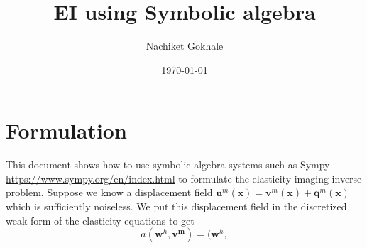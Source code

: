 \documentclass{article}
\newcommand{\beq}{\begin{equation}}
\newcommand{\eeq}{\end{equation}}
\begin{document}
\title{EI using Symbolic algebra}
\author{Nachiket Gokhale}
\date{\today}
\maketitle
\section{Formulation}
This document shows how to use symbolic algebra systems such as Sympy \url{https://www.sympy.org/en/index.html} to formulate the elasticity imaging inverse problem. Suppose we know a displacement field $\pmb{u}^m(\pmb{x})=\pmb{v}^m(\pmb{x}) + \pmb{q}^m(\pmb{x})$ which is sufficiently noiseless. We put this displacement field in the discretized weak form of the elasticity equations to get 
\beq
a(\pmb{w}^h,\pmb{v^m}) = (\pmb{w}^h,
\eeq
\end{document}
